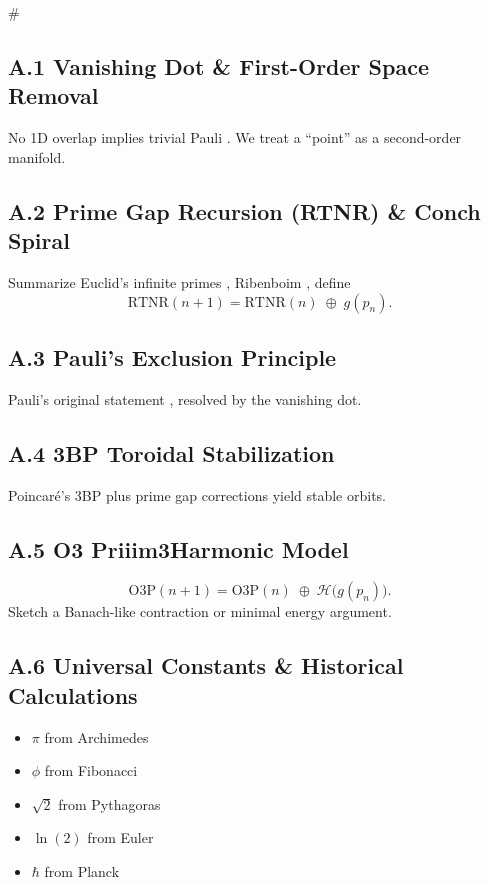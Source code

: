 #  \documentclass[11pt]{article}
\begin{document}
\subsection{A.1 Vanishing Dot \& First-Order Space Removal}
No 1D overlap implies trivial Pauli \cite{Pauli1925}. We treat a “point” as a second-order manifold.

\subsection{A.2 Prime Gap Recursion (RTNR) \& Conch Spiral}
Summarize Euclid’s infinite primes \cite{Euclid300BC}, Ribenboim \cite{Ribenboim1996}, define
\[
\mathrm{RTNR}(n+1) = \mathrm{RTNR}(n) \;\oplus\; g(p_n).
\]

\subsection{A.3 Pauli’s Exclusion Principle}
Pauli’s original statement \cite{Pauli1925}, resolved by the vanishing dot.

\subsection{A.4 3BP Toroidal Stabilization}
Poincaré’s 3BP \cite{Poincare1892} plus prime gap corrections yield stable orbits.

\subsection{A.5 O3 Priiim3Harmonic Model}
\[
\mathrm{O3P}(n+1) 
= \mathrm{O3P}(n) 
\;\oplus\; 
\mathcal{H}\bigl(g(p_n)\bigr).
\tag{A.5}
\]
Sketch a Banach-like contraction or minimal energy argument.

\subsection{A.6 Universal Constants \& Historical Calculations}
\begin{itemize}
    \item $\pi$ from Archimedes \cite{Archimedes287BC}
    \item $\phi$ from Fibonacci \cite{Fibonacci1202}
    \item $\sqrt{2}$ from Pythagoras \cite{Pythagoras500BC}
    \item $\ln(2)$ from Euler \cite{Euler1736}
    \item $\hbar$ from Planck \cite{Planck1900}
\end{itemize}
\end{document}
